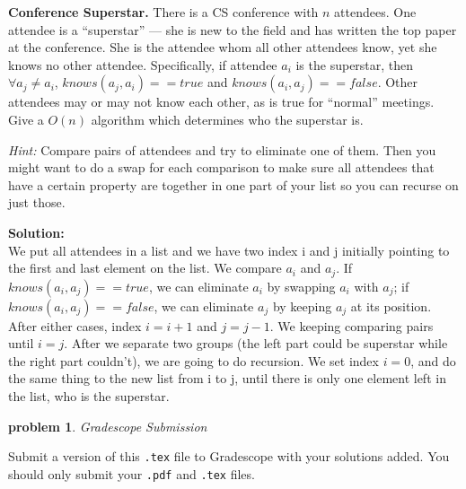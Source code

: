 \documentclass[10pt]{article}
\newtheorem{problem}{\sc\color{cit}problem}
\begin{document}
\noindent
\textbf{Conference Superstar.}  There is a CS conference with $n$ attendees. One attendee is a ``superstar'' --- she is new to the field and has written the top paper at the conference.  She is the attendee whom all other attendees know, yet she knows no other attendee.  Specifically, if attendee $a_i$ is the superstar, then $\forall a_j \neq a_i$, $knows(a_j, a_i) == true$ and $knows(a_i, a_j) == false$.  Other attendees may or may not know each other, as is true for ``normal'' meetings.  Give a $O(n)$ algorithm which determines who the superstar is.

\emph{Hint:} Compare pairs of attendees and try to eliminate one of them. Then you might  want to do a swap for each comparison to make sure all attendees that have a certain property are together in one part of your list so you can recurse on just those.      
      
      \textbf{Solution:}    \\
      We put all attendees in a list and we have two index i and j initially pointing to the first and last element on the list. We compare $a_i$ and $a_j$. If $knows(a_i, a_j) == true$, we can eliminate $a_i$ by swapping $a_i$ with $a_j$; if $knows(a_i, a_j) == false$, we can eliminate $a_j$ by keeping $a_j$ at its position. After either cases, index $i=i + 1$ and $j = j - 1$. We keeping comparing pairs until $i = j$. After we separate two groups (the left part could be superstar while the right part couldn't), we are going to do recursion. We set index $i = 0$, and do the same thing to the new list from i to j, until there is only one element left in the list, who is the superstar.

\begin{problem} Gradescope Submission \end{problem}
Submit a version of this \verb|.tex| file to Gradescope with your solutions added.  You should only submit your \verb|.pdf| and \verb|.tex| files.

%
%
\end{document}
